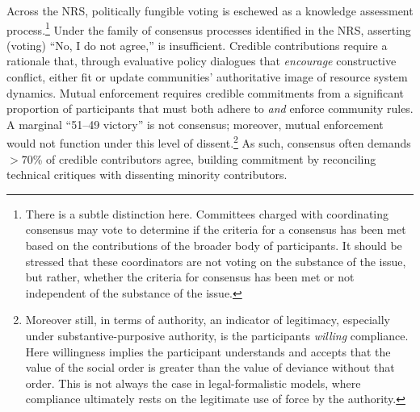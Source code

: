 \documentclass[12pt,journal,compsoc,letterpaper,onecolumn,twoside]{IEEEtran}
\begin{document}
Across the NRS, politically fungible voting
is eschewed as a knowledge assessment process.\footnote{There is a
  subtle distinction here.  Committees charged with coordinating
  consensus may vote to determine if the criteria for a consensus has
  been met based on the contributions of the broader body of
  participants.  It should be stressed that these coordinators are not
  voting on the substance of the issue, but rather, whether the
  criteria for consensus has been met or not independent of the
  substance of the issue.}
%
Under the family of consensus processes identified in the NRS, asserting (voting) ``No, I
do not agree,'' is insufficient.
%
Credible contributions require a rationale that, through evaluative
policy dialogues 
that \emph{encourage} constructive
conflict, either fit or update communities'
authoritative image of resource system dynamics.
%
%
%
Mutual enforcement requires credible commitments from a significant
proportion of 
participants that must both adhere to \emph{and} enforce community rules.
%
A marginal ``51--49 victory'' is not consensus; moreover, mutual
enforcement would not function under this level of
dissent.\footnote{Moreover still, in terms of authority, an indicator
  of legitimacy, especially under substantive-purposive authority, is
  the participants \emph{willing} compliance.  Here willingness
  implies the participant understands and accepts that the value of
  the social order is 
  greater than the value of deviance without that order.  This is not
  always the case in legal-formalistic models, where compliance
  ultimately rests on the legitimate use of force by the authority.}
%
As such, consensus often demands $>70$\% of credible contributors agree,
building commitment by reconciling technical critiques with dissenting minority
contributors.
%
\end{document}
